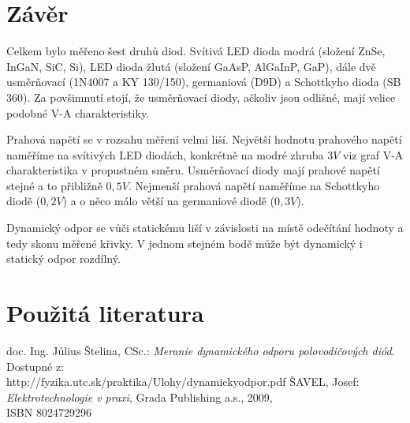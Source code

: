 \documentclass[12pt]{article} %
\begin{document}
\section*{Závěr}
Celkem bylo měřeno šest druhů diod. Svítivá LED dioda modrá (složení ZnSe, InGaN, SiC, Si), LED dioda žlutá (složení GaAsP, AlGaInP, GaP), dále dvě usměrňovací (1N4007 a KY 130/150), germaniová (D9D) a Schottkyho dioda (SB 360). Za povšimnutí stojí, že usměrňovací diody, ačkoliv jsou odlišné, mají velice podobné V-A charakteristiky.

Prahová napětí se v rozsahu měření velmi liší. Největší hodnotu prahového napětí naměříme na svítivých LED diodách, konkrétně na modré zhruba $3V$ viz graf V-A charakteristika v propustném směru. Usměrňovací diody mají prahové napětí stejné a to přibližně $0,5V$. Nejmenší prahová napětí naměříme na Schottkyho diodě ($0,2V$) a o něco málo větší na germaniové diodě ($0,3V$).

Dynamický odpor se vůči statickému liší v závislosti na místě odečítání hodnoty a tedy skonu měřené křivky. V jednom stejném bodě může být dynamický i statický odpor rozdílný.

\section*{Použitá literatura}
\begingroup
\renewcommand{\section}[2]{}
\begin{thebibliography}{9}
doc. Ing. Július Štelina, CSc.: {\em Meranie dynamického odporu polovodičových diód}. Dostupné z: \\ http://fyzika.utc.sk/praktika/Ulohy/dynamickyodpor.pdf
ŠAVEL, Josef: {\em Elektrotechnologie v praxi}, Grada Publishing a.s., 2009,\\ ISBN 8024729296
\end{thebibliography}
\endgroup
\end{document}
